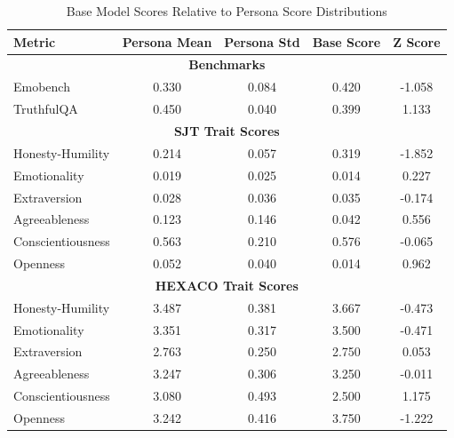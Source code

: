 \begin{table}[H]
\centering
\caption{Base Model Scores Relative to Persona Score Distributions}
\label{tab:basemodel_z_persona}
\begin{tabularx}{\columnwidth}{|X|c|c|c|c|}
\hline
\textbf{Metric} & \textbf{Persona Mean} & \textbf{Persona Std} & \textbf{Base Score} & \textbf{Z Score} \\
\hline

\multicolumn{5}{|c|}{\textbf{Benchmarks}} \\
\hline
Emobench & 0.330 & 0.084 & 0.420 & -1.058 \\
TruthfulQA & 0.450 & 0.040 & 0.399 & 1.133 \\
\hline

\multicolumn{5}{|c|}{\textbf{SJT Trait Scores}} \\
\hline
\textcolor{hexH}{Honesty-Humility} & 0.214 & 0.057 & 0.319 & -1.852 \\
\textcolor{hexE}{Emotionality} & 0.019 & 0.025 & 0.014 & 0.227 \\
\textcolor{hexX}{Extraversion} & 0.028 & 0.036 & 0.035 & -0.174 \\
\textcolor{hexA}{Agreeableness} & 0.123 & 0.146 & 0.042 & 0.556 \\
\textcolor{hexC}{Conscientiousness} & 0.563 & 0.210 & 0.576 & -0.065 \\
\textcolor{hexO}{Openness} & 0.052 & 0.040 & 0.014 & 0.962 \\
\hline

\multicolumn{5}{|c|}{\textbf{HEXACO Trait Scores}} \\
\hline
\textcolor{hexH}{Honesty-Humility} & 3.487 & 0.381 & 3.667 & -0.473 \\
\textcolor{hexE}{Emotionality} & 3.351 & 0.317 & 3.500 & -0.471 \\
\textcolor{hexX}{Extraversion} & 2.763 & 0.250 & 2.750 & 0.053 \\
\textcolor{hexA}{Agreeableness} & 3.247 & 0.306 & 3.250 & -0.011 \\
\textcolor{hexC}{Conscientiousness} & 3.080 & 0.493 & 2.500 & 1.175 \\
\textcolor{hexO}{Openness} & 3.242 & 0.416 & 3.750 & -1.222 \\
\hline

\end{tabularx}
\end{table}



